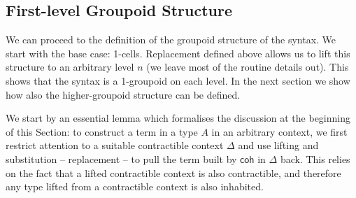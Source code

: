 

\subsection{First-level Groupoid Structure}
We can proceed to the definition of the groupoid structure of the syntax. We start with the base case: 1-cells. Replacement defined above allows us to lift this structure to an arbitrary level $n$ (we leave most of the routine details out). This shows that the syntax is a 1-groupoid on each level. In the next section we show how also the higher-groupoid structure can be defined. 

We start by an essential lemma which formalises the discussion at the
beginning of this Section: to construct a term in a type $A$ in an
arbitrary context, we first restrict attention to a suitable
contractible context $\Delta$ and use lifting and substitution -- replacement -- to pull the term built by $\mathsf{coh}$ in $\Delta$
back.  This relies on the fact that a lifted contractible context is
also contractible, and therefore any type lifted from a contractible
context is also inhabited.

